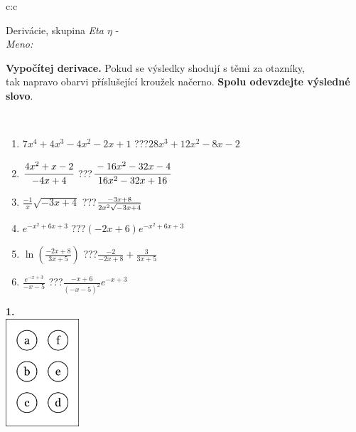 \documentclass[10pt]{report}
\begin{document}
\begin{tabular}{c:c}
\begin{minipage}[c][104.5mm][t]{0.5\linewidth}
\begin{center}
\vspace{7mm}
{\huge Derivácie, skupina \textit{Eta $\eta$} -}\\[5mm]
\textit{Meno:}\phantom{xxxxxxxxxxxxxxxxxxxxxxxxxxxxxxxxxxxxxxxxxxxxxxxxxxxxxxxxxxxxxxxxx}\\[5mm]
\begin{minipage}{0.95\linewidth}
\begin{center}
\textbf{Vypočítej derivace.} Pokud se výsledky shodují s těmi za otazníky,\\tak napravo obarvi příslušející kroužek načerno. \textbf{Spolu odevzdejte výsledné slovo}.
\end{center}
\end{minipage}
\\[1mm]
\begin{minipage}{0.79\linewidth}
\begin{center}
\begin{varwidth}{\linewidth}
\begin{enumerate}
\normalsize
\item $7x^4+4x^3-4x^2-2x+1$\quad \dotfill\; ???\;\dotfill \quad $28x^3+12x^2-8x-2$
\item $\cfrac{4x^2+x-2}{-4x+4}$\quad \dotfill\; ???\;\dotfill \quad $\cfrac{-16x^2-32x-4}{16x^2-32x+16}$
\item $\frac{-1}{x}\sqrt{-3x+4}$\quad \dotfill\; ???\;\dotfill \quad $\frac{-3x+8}{2x^2 \sqrt{\smash[b]{-3x+4}}}$
\item $e^{-x^2+6x+3}$\quad \dotfill\; ???\;\dotfill \quad $(-2x+6)e^{-x^2+6x+3}$
\item $\ln{\left(\frac{-2x+8}{3x+5}\right)}$\quad \dotfill\; ???\;\dotfill \quad $\frac{-2}{-2x+8}+\frac{3}{3x+5}$
\item $\frac{e^{-x+3}}{-x-5}$\quad \dotfill\; ???\;\dotfill \quad $\frac{-x+6}{(-x-5)^2}e^{-x+3}$
\end{enumerate}
\end{varwidth}
\end{center}
\end{minipage}
\begin{minipage}{0.20\linewidth}
\begin{center}
{\Huge\bfseries 1.} \\[2mm]
\includegraphics[height=40mm]{../images/braille.png}

\end{center}
\end{minipage}
\end{center}
\end{minipage}
\end{tabular}
\end{document}
